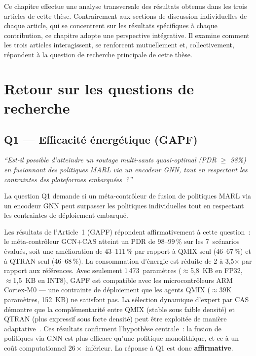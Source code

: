 \label{sec:Discussion}

Ce chapitre effectue une analyse transversale des résultats obtenus dans les trois articles de cette thèse. Contrairement aux sections de discussion individuelles de chaque article, qui se concentrent sur les résultats spécifiques à chaque contribution, ce chapitre adopte une perspective intégrative. Il examine comment les trois articles interagissent, se renforcent mutuellement et, collectivement, répondent à la question de recherche principale de cette thèse.


\section{Retour sur les questions de recherche}\label{sec:disc-retour-questions}

\subsection{Q1 --- Efficacité énergétique (GAPF)}

\noindent\textit{``Est-il possible d'atteindre un routage multi-sauts quasi-optimal (PDR $\geq$ 98\%) en fusionnant des politiques MARL via un encodeur GNN, tout en respectant les contraintes des plateformes embarquées~?''}

\medskip
La question Q1 demande si un méta-contrôleur de fusion de politiques MARL via un encodeur GNN peut surpasser les politiques individuelles tout en respectant les contraintes de déploiement embarqué.

Les résultats de l'Article~1 (GAPF) répondent affirmativement à cette question~: le méta-contrôleur GCN+CAS atteint un PDR de 98--99\,\% sur les 7~scénarios évalués, soit une amélioration de 43--111\,\% par rapport à QMIX seul (46--67\,\%) et à QTRAN seul (46--68\,\%). La consommation d'énergie est réduite de 2 à 3{,}5$\times$ par rapport aux références. Avec seulement 1\,473~paramètres ($\approx$5{,}8~KB en FP32, $\approx$1{,}5~KB en INT8), GAPF est compatible avec les microcontrôleurs ARM Cortex-M0 --- une contrainte de déploiement que les agents QMIX ($\approx$39K paramètres, 152~KB) ne satisfont pas. La sélection dynamique d'expert par CAS démontre que la complémentarité entre QMIX (stable sous faible densité) et QTRAN (plus expressif sous forte densité) peut être exploitée de manière adaptative~\cite{rashid2018qmix,son2019qtran}. Ces résultats confirment l'hypothèse centrale~: la fusion de politiques via GNN est plus efficace qu'une politique monolithique, et ce à un coût computationnel $26\times$ inférieur. La réponse à Q1 est donc \textbf{affirmative}.

